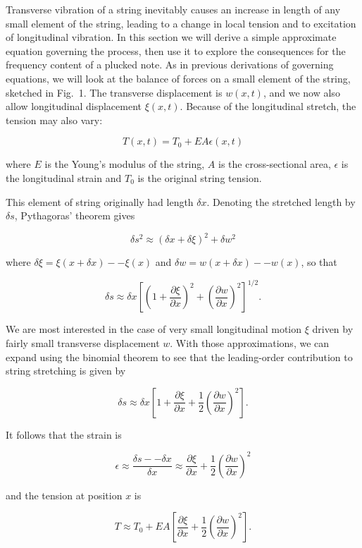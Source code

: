   Transverse vibration of a string inevitably causes an increase in length of 
  any small element of the string, leading to a change in local tension and to 
  excitation of longitudinal vibration. In this section we will derive a simple 
  approximate equation governing the process, then use it to explore the 
  consequences for the frequency content of a plucked note. As in previous 
  derivations of governing equations, we will look at the balance of forces on 
  a small element of the string, sketched in Fig.\ 1. The transverse 
  displacement is $w(x,t)$, and we now also allow longitudinal displacement 
  $\xi(x,t)$. Because of the longitudinal stretch, the tension may also vary: 

  $$T(x,t) = T_0 +EA\epsilon(x,t) \tag{1}$$ 

  where $E$ is the Young's modulus of the string, $A$ is the cross-sectional 
  area, $\epsilon$ is the longitudinal strain and $T_0$ is the original string 
  tension. 

  This element of string originally had length $\delta x$. Denoting the 
  stretched length by $\delta s$, Pythagoras' theorem gives 

  $$\delta s^2 \approx (\delta x + \delta \xi)^2 + \delta w^2 \tag{2} $$ 

  where $\delta \xi=\xi(x + \delta x) -- \xi(x)$ and $\delta w=w(x + \delta x) 
  -- w(x)$, so that 

  $$\delta s \approx \delta x \left[ \left(1 + \dfrac{\partial \xi}{\partial 
  x}\right)^2 + \left(\dfrac{\partial w}{\partial x}\right)^2 \right]^{1/2} . 
  \tag{3}$$ 

  We are most interested in the case of very small longitudinal motion $\xi$ 
  driven by fairly small transverse displacement $w$. With those 
  approximations, we can expand using the binomial theorem to see that the 
  leading-order contribution to string stretching is given by 

  $$\delta s \approx \delta x \left[ 1 + \dfrac{\partial \xi}{\partial x} + 
  \dfrac{1}{2}\left(\dfrac{\partial w}{\partial x}\right)^2 \right] . \tag{4}$$ 

  It follows that the strain is 

  $$\epsilon \approx \dfrac{\delta s -- \delta x}{\delta x} \approx 
  \dfrac{\partial \xi}{\partial x} + \dfrac{1}{2}\left(\dfrac{\partial 
  w}{\partial x}\right)^2 \tag{5}$$ 

  and the tension at position $x$ is 

  $$T \approx T_0 + EA\left[\dfrac{\partial \xi}{\partial x} + 
  \dfrac{1}{2}\left(\dfrac{\partial w}{\partial x}\right)^2 \right] . \tag{6}$$ 

